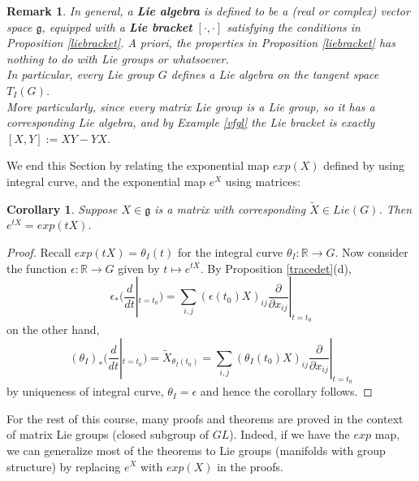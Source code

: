 \documentclass[11pt]{article}
\newtheorem{corollary}[theorem]{Corollary}
\newtheorem{remark}[theorem]{Remark}
\newcommand{\bb}[1]{\mathbb{#1}}
\newcommand{\mf}[1]{\mathfrak{#1}}
\begin{document}
\begin{remark}
In general, a \textbf{Lie algebra} is defined to be a (real or complex) vector space $\mf{g}$, equipped with a \textbf{Lie bracket} $[\cdot,\cdot]$ satisfying the conditions in Proposition \ref{liebracket}. A priori, the properties in Proposition \ref{liebracket} has nothing to do with Lie groups or whatsoever.\\
In particular, every Lie group $G$ defines a Lie algebra on the tangent space $T_I(G)$.\\
More particularly, since every matrix Lie group is a Lie group, so it has a corresponding Lie algebra, and by Example \ref{vfgl} the Lie bracket is exactly $[X,Y] := XY - YX$.
\end{remark}

We end this Section by relating the exponential map $exp(X)$ defined by using integral curve, and the exponential map $e^X$ using matrices:
\begin{corollary}
Suppose $X \in \mf{g}$ is a matrix with corresponding $\tilde{X} \in Lie(G)$. Then $e^{tX} = exp(tX)$.
\end{corollary}
\begin{proof}
Recall $exp(tX) = \theta_I(t)$ for the integral curve $\theta_I: \bb{R} \to G$. Now consider the function $\epsilon: \bb{R} \to G$ given by $t \mapsto e^{tX}$. By Proposition \ref{tracedet}(d),
$$\epsilon_*(\frac{d}{dt}|_{t = t_0}) = \sum_{i,j} (\epsilon(t_0)X)_{ij} \frac{\partial}{\partial x_{ij}}|_{t = t_0}$$
on the other hand,
$$(\theta_I)_*(\frac{d}{dt}|_{t = t_0}) = \tilde{X}_{\theta_I(t_0)} = \sum_{i,j} (\theta_I(t_0)X)_{ij} \frac{\partial}{\partial x_{ij}}|_{t = t_0}$$
by uniqueness of integral curve, $\theta_I = \epsilon$ and hence the corollary follows.
\end{proof}
For the rest of this course, many proofs and theorems are proved in the context of matrix Lie groups (closed subgroup of $GL$). Indeed, if we have the $exp$ map, we can generalize most of the theorems to Lie groups (manifolds with group structure) by replacing $e^X$ with $exp(X)$ in the proofs.
\end{document}
